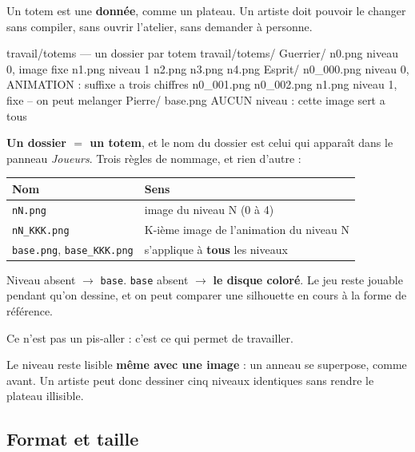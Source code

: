 Un totem est une \textbf{donnée}, comme un plateau. Un artiste doit pouvoir le
changer sans compiler, sans ouvrir l'atelier, sans demander à personne.

\begin{nkcode}{travail/totems — un dossier par totem}
travail/totems/
    Guerrier/
        n0.png          niveau 0, image fixe
        n1.png          niveau 1
        n2.png  n3.png  n4.png
    Esprit/
        n0_000.png      niveau 0, ANIMATION : suffixe a trois chiffres
        n0_001.png
        n0_002.png
        n1.png          niveau 1, fixe -- on peut melanger
    Pierre/
        base.png        AUCUN niveau : cette image sert a tous
\end{nkcode}

\textbf{Un dossier $=$ un totem}, et le nom du dossier est celui qui apparaît
dans le panneau \emph{Joueurs}. Trois règles de nommage, et rien d'autre :

\begin{center}
\begin{tabular}{@{}p{4.6cm}p{9.2cm}@{}}
\toprule
\textbf{Nom} & \textbf{Sens} \\
\midrule
\texttt{nN.png} & image du niveau N (0 à 4) \\
\texttt{nN\_KKK.png} & K-ième image de l'animation du niveau N \\
\texttt{base.png}, \texttt{base\_KKK.png} & s'applique à \textbf{tous} les niveaux \\
\bottomrule
\end{tabular}
\end{center}

\begin{nkretenir}
Niveau absent $\rightarrow$ \texttt{base}. \texttt{base} absent $\rightarrow$
\textbf{le disque coloré}. Le jeu reste jouable pendant qu'on dessine, et on peut
comparer une silhouette en cours à la forme de référence.

Ce n'est pas un pis-aller : c'est ce qui permet de travailler.
\end{nkretenir}

Le niveau reste lisible \textbf{même avec une image} : un anneau se superpose,
comme avant. Un artiste peut donc dessiner cinq niveaux identiques sans rendre le
plateau illisible.

\subsection{Format et taille}

